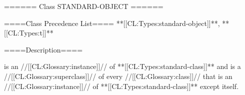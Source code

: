 ====== Class STANDARD-OBJECT ======

====Class Precedence List==== **[[CL:Types:standard-object]]**, **[[CL:Types:t]]**

====Description====

 is an //[[CL:Glossary:instance]]// of **[[CL:Types:standard-class]]** and is a //[[CL:Glossary:superclass]]// of every //[[CL:Glossary:class]]// that is an //[[CL:Glossary:instance]]// of **[[CL:Types:standard-class]]** except itself.

